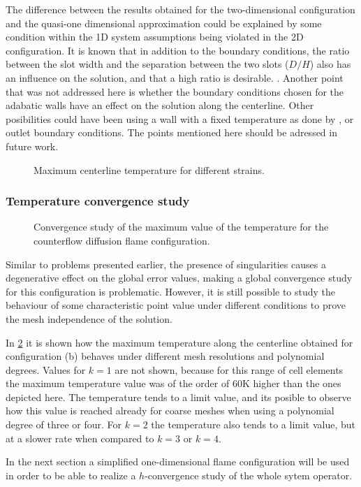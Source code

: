 The difference between the results obtained for the two-dimensional configuration and the quasi-one dimensional approximation could be explained by some condition within the 1D system assumptions being violated in the 2D configuration. It is known that in addition to the boundary conditions, the ratio between the slot width and the separation between the two slots ($D/H$) also has an influence on the solution, and that a high ratio is desirable. \cite{frouzakisTwodimensionalDirectNumerical1998}. Another point that was not addressed here is whether the boundary conditions chosen for the adabatic walls have an effect on the solution along the centerline. Other posibilities could have been using a wall with a fixed temperature as done by \cite{frouzakisTwodimensionalDirectNumerical1998}, or outlet boundary conditions. The points mentioned here should be adressed in future work.

\begin{figure}[tbp]
	\centering
	\caption{Maximum centerline temperature for different strains.}
	\label{fig:TemperatureStrainPlot}
\end{figure}
\subsubsection{Temperature convergence study}
\begin{figure}[tbp]
	\centering
	\caption{Convergence study of the maximum value of the temperature for the counterflow diffusion flame configuration.}
	\label{fig:TemperatureConvergenceDiffFlame}
\end{figure}
Similar to problems presented earlier, the presence of singularities causes a degenerative effect on the global error values, making a global convergence study for this configuration is problematic. However, it is still possible to study the behaviour of some characteristic point value under different conditions to prove the mesh independence of the solution.

In \cref{fig:TemperatureConvergenceDiffFlame} it is shown how the maximum temperature along the centerline obtained for configuration (b)  behaves under different mesh resolutions and polynomial degrees. Values for $k=1$ are not shown, because for this range of cell elements the maximum temperature value was of the order of 60K higher than the ones depicted here. The temperature tends to a limit value, and its posible to observe how this value is reached already for coarse meshes when using a polynomial degree of three or four. For $k=2$ the temperature also tends to a limit value, but at a slower rate when compared to $k =3$ or $k = 4$. 

In the next section a simplified one-dimensional flame configuration will be used in order to be able to realize a $h$-convergence study of the whole sytem operator.

